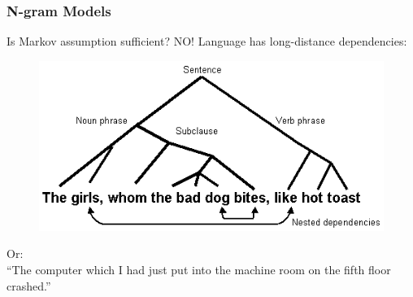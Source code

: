 \documentclass{beamer}
\begin{document}






\begin{frame}\frametitle{N-gram Models}

\begin{block}{Is Markov assumption sufficient? \alert{NO!}}
Language has long-distance dependencies:

\begin{figure}
\includegraphics[width=0.6\linewidth]{figure/long-distance-dependency.png}
\label{fig:long-distance-dependency}
\end{figure}

Or:  \\

``The computer which I had just put into the machine room on the fifth
floor crashed.'' 

\end{block}
\end{frame}
\end{document}
